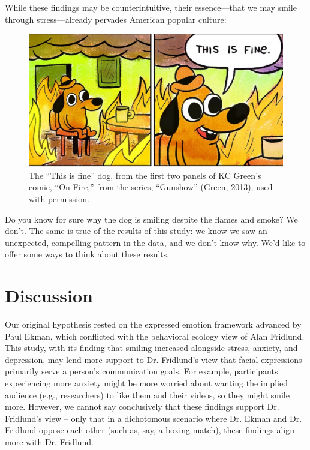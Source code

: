 \documentclass[authordate, empirical]{jote-new-article}
\begin{document}
While these findings may be counterintuitive, their essence—that we may smile through stress—already pervades American popular culture:







\begin{figure}[h]
  \includegraphics[width=\linewidth]{media/image5.jpeg}

  \caption{The “This is fine” dog, from the first two panels of KC Green's comic, “On Fire,” from the series, “Gunshow” (Green, 2013); used with permission.}

  \label{fig:rId12}


\end{figure}










Do you know for sure why the dog is smiling despite the flames and smoke? We don't. The same is true of the results of this study: we know we saw an unexpected, compelling pattern in the data, and we don't know why. We'd like to offer some ways to think about these results.







\section{Discussion}







Our original hypothesis rested on the expressed emotion framework advanced by Paul Ekman, which conflicted with the behavioral ecology view of Alan Fridlund. This study, with its finding that smiling increased alongside stress, anxiety, and depression, may lend more support to Dr. Fridlund's view that facial expressions primarily serve a person's communication goals. For example, participants experiencing more anxiety might be more worried about wanting the implied audience (e.g., researchers) to like them and their videos, so they might smile more. However, we cannot say conclusively that these findings support Dr. Fridlund's view -- only that in a dichotomous scenario where Dr. Ekman and Dr. Fridlund oppose each other (such as, say, a boxing match), these findings align more with Dr. Fridlund.
\end{document}

